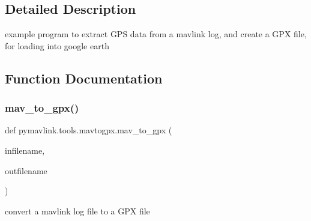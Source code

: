 \subsection{Detailed Description}
\begin{DoxyVerb}example program to extract GPS data from a mavlink log, and create a GPX
file, for loading into google earth
\end{DoxyVerb}
 

\subsection{Function Documentation}
\mbox{\label{namespacepymavlink_1_1tools_1_1mavtogpx_a76a1d5d7118b71ed2aea6781eedc6d13}} 
\subsubsection{\texorpdfstring{mav\+\_\+to\+\_\+gpx()}{mav\_to\_gpx()}}
{\footnotesize\ttfamily def pymavlink.\+tools.\+mavtogpx.\+mav\+\_\+to\+\_\+gpx (\begin{DoxyParamCaption}\item[{}]{infilename,  }\item[{}]{outfilename }\end{DoxyParamCaption})}

\begin{DoxyVerb}convert a mavlink log file to a GPX file\end{DoxyVerb}
 